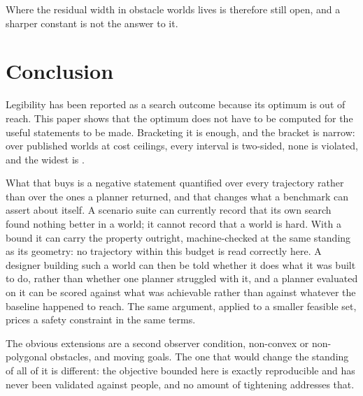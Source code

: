 \documentclass[journal]{IEEEtran}
\begin{document}
Where the residual width in obstacle worlds lives is therefore still open, and
a sharper constant is not the answer to it.

\section{Conclusion}
\label{sec:conclusion}

Legibility has been reported as a search outcome because its optimum is out of
reach. This paper shows that the optimum does not have to be computed for the
useful statements to be made. Bracketing it is enough, and the bracket is
narrow: over \suiteWorlds{} published worlds at \suiteCeilings{} cost ceilings,
every interval is two-sided, none is violated, and the widest is
\suiteWorstGap{}.

What that buys is a negative statement quantified over every trajectory rather
than over the ones a planner returned, and that changes what a benchmark can
assert about itself. A scenario suite can currently record that its own search
found nothing better in a world; it cannot record that a world is hard. With a
bound it can carry the property outright, machine-checked at the same standing
as its geometry: no trajectory within this budget is read correctly here. A
designer building such a world can then be told whether it does what it was
built to do, rather than whether one planner struggled with it, and a planner
evaluated on it can be scored against what was achievable rather than against
whatever the baseline happened to reach. The same argument, applied to a
smaller feasible set, prices a safety constraint in the same terms.

The obvious extensions are a second observer condition, non-convex or
non-polygonal obstacles, and moving goals. The one that would change the
standing of all of it is different: the objective bounded here is exactly
reproducible and has never been validated against people, and no amount of
tightening addresses that.



\end{document}
